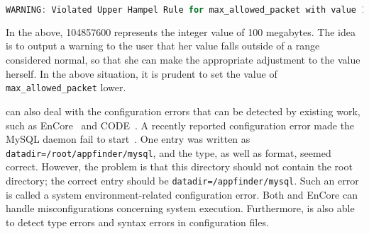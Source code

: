 \begin{lstlisting}[language=C, xleftmargin=.01\textwidth]
WARNING: Violated Upper Hampel Rule for max_allowed_packet with value 104857600 
\end{lstlisting} 

In the above, 104857600 represents the integer value of 100 megabytes. The idea is to output
a warning to the user that her value falls outside of a range considered normal, so that she
can make the appropriate adjustment to the value herself. In the above situation, it is 
prudent to set the value of {\tt max\_allowed\_packet} lower. 

\app can also deal with the configuration errors that can be detected by
existing work, such as EnCore~\cite{zhang14encore} and
CODE~\cite{yuan11context}.
A recently reported configuration error made the MySQL
daemon fail to start~\cite{syserror}.
One entry was written as 
{\tt datadir=/root/appfinder/mysql}, and the type, as well as 
format, seemed correct.
However, the problem is that this directory should not 
contain the root directory; the correct entry
should be {\tt datadir=/appfinder/mysql}.
Such an error is called a system environment-related configuration error.
Both \app and EnCore can handle misconfigurations concerning system execution.
Furthermore, \app is also able to detect type errors and syntax errors
in configuration files.
